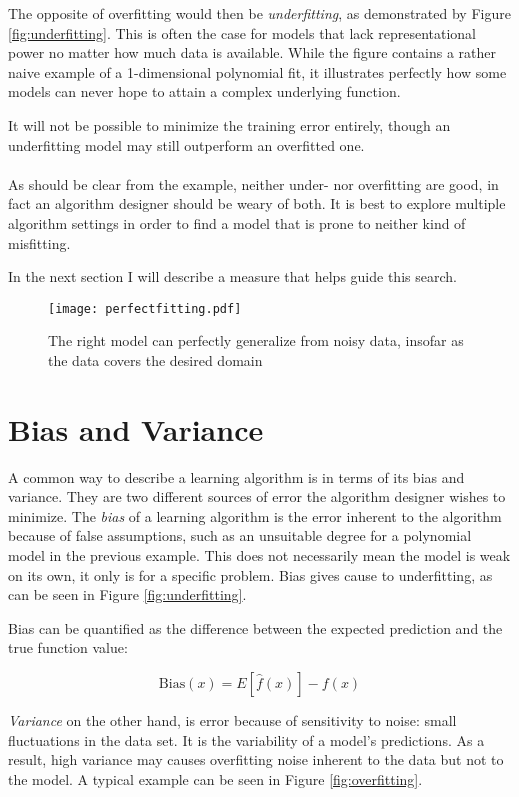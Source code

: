 The opposite of overfitting would then be \textit{underfitting},
as demonstrated by Figure \ref{fig:underfitting}.
This is often the case for models that lack
representational power
no matter how much data is available.
While the figure contains a rather naive example
of a 1-dimensional polynomial fit,
it illustrates perfectly how some models
can never hope to attain a complex underlying function.

It will not be possible to minimize the training error entirely,
though an underfitting model may still outperform
an overfitted one.

\paragraph{}
As should be clear from the example,
neither under- nor overfitting are good,
in fact an algorithm designer
should be weary of both.
It is best to explore multiple
algorithm settings in order to find
a model that is prone to
neither kind of misfitting.

In the next section I will describe a measure
that helps guide this search.

\begin{figure}[h]
\center
\texttt{[image: perfectfitting.pdf]}
\label{fig:perfectfitting}
\caption[Curve fitting]{The right model can perfectly generalize from noisy data,
insofar as the data covers the desired domain}
\end{figure}

\section{Bias and Variance}
A common way to describe a learning algorithm
is in terms of its
bias and variance.
They are two different sources of error
the algorithm designer wishes to minimize.
The \textit{bias} of a learning algorithm
is the error inherent to the algorithm
because of false assumptions,
such as an unsuitable degree for a polynomial model
in the previous example.
This does not necessarily mean the model is weak on its own,
it only is for a specific problem.
Bias gives cause to underfitting,
as can be seen in Figure \ref{fig:underfitting}.

Bias can be quantified as the difference
between the expected prediction
and the true function value:

$$
\text{Bias}(x) = E[\hat{f} (x)] - f(x)
$$

\textit{Variance}
on the other hand,
is error because of sensitivity to noise:
small fluctuations in the data set.
It is the variability of a model's predictions.
As a result,
high variance may causes overfitting
noise inherent to the data but not to the model.
A typical example can be seen in Figure \ref{fig:overfitting}.

